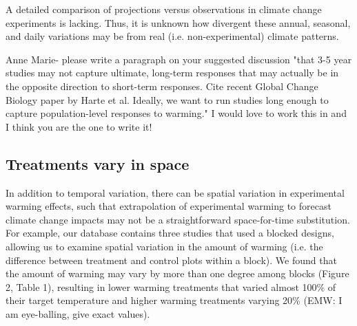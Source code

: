 \documentclass{article}
\begin{document}
\par A detailed comparison of projections versus observations in climate change experiments is lacking. Thus, it is unknown how divergent these annual, seasonal, and daily variations may be from real (i.e. non-experimental) climate patterns.  %

\par Anne Marie- please write a paragraph on your suggested discussion "that 3-5 year studies may not capture ultimate, long-term responses that may actually be in the opposite direction to short-term responses.  Cite recent Global Change Biology paper by Harte et al.  Ideally, we want to run studies long enough to capture population-level responses to warming." I would love to work this in and I think you are the one to write it!
\subsection* {Treatments vary in space}
In addition to temporal variation, there can be spatial variation in experimental warming effects, such that extrapolation of experimental warming to forecast climate change impacts may not be a straightforward space-for-time substitution. For example, our database contains three studies that used a blocked designs, allowing us to examine spatial variation in the amount of warming (i.e. the difference between treatment and control plots within a block). We found that the amount of warming may vary by more than one degree among blocks (Figure 2, Table 1), resulting in lower warming treatments that varied almost 100\% of their target temperature and higher warming treatments varying 20\% (EMW: I am eye-balling, give exact values).%
\end{document}
